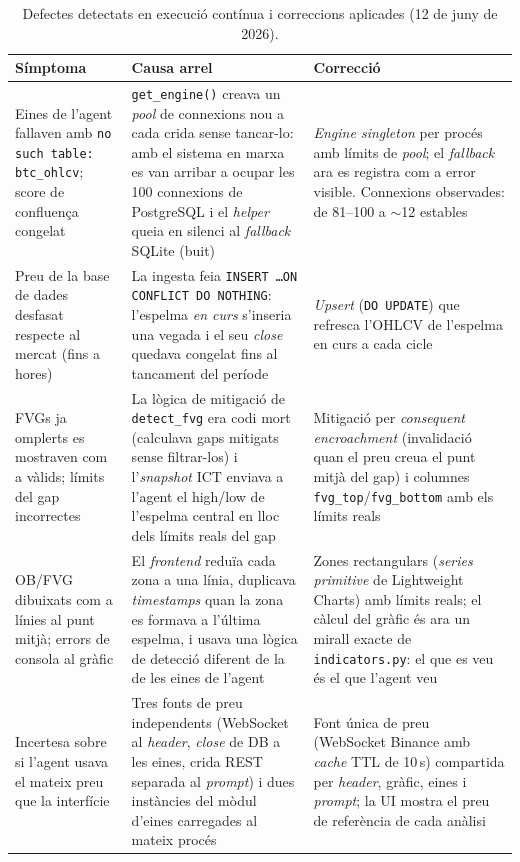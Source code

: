 \documentclass[12pt, a4paper]{report}
\begin{document}
\begin{table}[H]
\centering
\small
\begin{tabular}{p{3.4cm} p{5.2cm} p{5.2cm}}
\toprule
\textbf{Símptoma} & \textbf{Causa arrel} & \textbf{Correcció} \\
\midrule
Eines de l'agent fallaven amb \texttt{no such table: btc\_ohlcv}; score de confluença congelat &
\texttt{get\_engine()} creava un \textit{pool} de connexions nou a cada crida sense tancar-lo: amb el sistema en marxa es van arribar a ocupar les 100 connexions de PostgreSQL i el \textit{helper} queia en silenci al \textit{fallback} SQLite (buit) &
\textit{Engine singleton} per procés amb límits de \textit{pool}; el \textit{fallback} ara es registra com a error visible. Connexions observades: de 81--100 a $\sim$12 estables \\
\addlinespace
Preu de la base de dades desfasat respecte al mercat (fins a hores) &
La ingesta feia \texttt{INSERT \dots ON CONFLICT DO NOTHING}: l'espelma \emph{en curs} s'inseria una vegada i el seu \textit{close} quedava congelat fins al tancament del període &
\textit{Upsert} (\texttt{DO UPDATE}) que refresca l'OHLCV de l'espelma en curs a cada cicle \\
\addlinespace
FVGs ja omplerts es mostraven com a vàlids; límits del gap incorrectes &
La lògica de mitigació de \texttt{detect\_fvg} era codi mort (calculava gaps mitigats sense filtrar-los) i l'\textit{snapshot} ICT enviava a l'agent el high/low de l'espelma central en lloc dels límits reals del gap &
Mitigació per \textit{consequent encroachment} (invalidació quan el preu creua el punt mitjà del gap) i columnes \texttt{fvg\_top}/\texttt{fvg\_bottom} amb els límits reals \\
\addlinespace
OB/FVG dibuixats com a línies al punt mitjà; errors de consola al gràfic &
El \textit{frontend} reduïa cada zona a una línia, duplicava \textit{timestamps} quan la zona es formava a l'última espelma, i usava una lògica de detecció diferent de la de les eines de l'agent &
Zones rectangulars (\textit{series primitive} de Lightweight Charts) amb límits reals; el càlcul del gràfic és ara un mirall exacte de \texttt{indicators.py}: el que es veu és el que l'agent veu \\
\addlinespace
Incertesa sobre si l'agent usava el mateix preu que la interfície &
Tres fonts de preu independents (WebSocket al \textit{header}, \textit{close} de DB a les eines, crida REST separada al \textit{prompt}) i dues instàncies del mòdul d'eines carregades al mateix procés &
Font única de preu (WebSocket Binance amb \textit{cache} TTL de 10\,s) compartida per \textit{header}, gràfic, eines i \textit{prompt}; la UI mostra el preu de referència de cada anàlisi \\
\bottomrule
\end{tabular}
\caption{Defectes detectats en execució contínua i correccions aplicades (12 de juny de 2026).}
\label{tab:fiabilitat}
\end{table}
\end{document}
